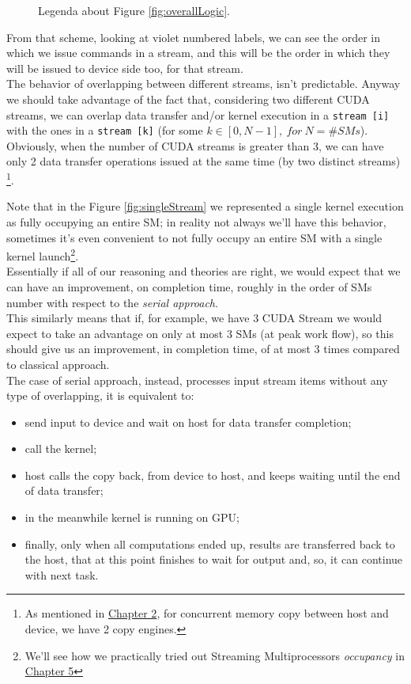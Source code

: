 \begin{figure}
		\caption{Legenda about Figure \ref{fig:overallLogic}.}
	\end{figure}
	From that scheme, looking at violet numbered labels, we can see the order in which we issue commands in a stream, and this will be the order in which they will be issued to device side too, for that stream. \\
	The behavior of overlapping between different streams, isn't predictable. Anyway we should take advantage of the fact that, considering two different CUDA streams, we can overlap data transfer and/or kernel execution in a \texttt{stream [i]} with the ones in a \texttt{stream [k]} (for some \(k\in[0,N-1], \: for \: N =\# SMs\)). Obviously, when the number of CUDA streams is greater than 3, we can have only 2 data transfer operations issued at the same time (by two distinct streams) \footnote{As mentioned in \hyperref[chap:tools]{Chapter 2}, for concurrent memory copy between host and device, we have 2 copy engines.}.
	
	Note that in the Figure \ref{fig:singleStream} we represented a single kernel execution as fully occupying an entire SM; in reality not always we'll have this behavior, sometimes it's even convenient to not fully occupy an entire SM with a single kernel launch\footnote{We'll see how we practically tried out Streaming Multiprocessors \textit{occupancy} in  \hyperref[chap:experim]{Chapter 5}}. \\
	
	Essentially if all of our reasoning and theories are right, we would expect that we can have an improvement, on completion time, roughly in the order of SMs number with respect to the \textit{serial approach}. \\
	This similarly means that if, for example, we have 3 CUDA Stream we would expect to take an advantage on only at most 3 SMs (at peak work flow), so this should give us an improvement, in completion time, of at most 3 times compared to classical approach.\\
	The case of serial approach, instead, processes input stream items without any type of overlapping, it is equivalent to:
	\begin{itemize}
		\item send input to device and wait on host for data transfer completion;
		\item call the kernel;
		\item host calls the copy back, from device to host, and keeps waiting until the end of data transfer;
		\item in the meanwhile kernel is running on GPU; 
		\item finally, only when all computations ended up, results are transferred back to the host, that at this point finishes to wait for output and, so, it can continue with next task.
	\end{itemize} 
	

